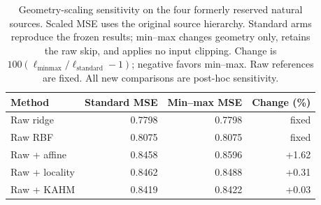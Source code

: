 \begin{table}[t]
\centering
\small
\begin{tabular}{lrrr}
\toprule
Method & Standard MSE & Min--max MSE & Change (\%) \\
\midrule
Raw ridge & 0.7798 & 0.7798 & fixed \\
Raw RBF & 0.8075 & 0.8075 & fixed \\
Raw + affine & 0.8458 & 0.8596 & +1.62 \\
Raw + locality & 0.8462 & 0.8488 & +0.31 \\
Raw + KAHM & 0.8419 & 0.8422 & +0.03 \\
\bottomrule
\end{tabular}
\caption{Geometry-scaling sensitivity on the four formerly reserved natural sources. Scaled MSE uses the original source hierarchy. Standard arms reproduce the frozen results; min--max changes geometry only, retains the raw skip, and applies no input clipping. Change is $100(\ell_{\mathrm{minmax}}/\ell_{\mathrm{standard}}-1)$; negative favors min--max. Raw references are fixed. All new comparisons are post-hoc sensitivity.}
\label{tab:scaling-natural}
\end{table}
